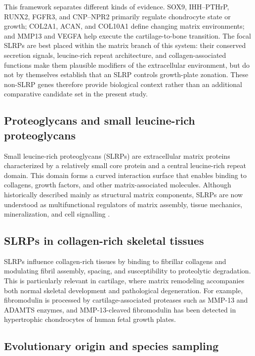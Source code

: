 This framework separates different kinds of evidence. SOX9, IHH--PTHrP,
RUNX2, FGFR3, and CNP--NPR2 primarily regulate chondrocyte state or growth;
COL2A1, ACAN, and COL10A1 define changing matrix environments; and MMP13 and
VEGFA help execute the cartilage-to-bone transition. The focal SLRPs are best
placed within the matrix branch of this system: their conserved secretion
signals, leucine-rich repeat architecture, and collagen-associated functions
make them plausible modifiers of the extracellular environment, but do not by
themselves establish that an SLRP controls growth-plate zonation. These
non-SLRP genes therefore provide biological context rather than an additional
comparative candidate set in the present study.

\subsection{Proteoglycans and small leucine-rich proteoglycans}
\label{subsec:proteoglycans-slrps}

Small leucine-rich proteoglycans (SLRPs) are extracellular matrix proteins characterized by a relatively small core protein and a central leucine-rich repeat domain. This domain forms a curved interaction surface that enables binding to collagens, growth factors, and other matrix-associated molecules. Although historically described mainly as structural matrix components, SLRPs are now understood as multifunctional regulators of matrix assembly, tissue mechanics, mineralization, and cell signalling \citep{SchaeferIozzo2008,IozzoSchaefer2015}.

\subsection{SLRPs in collagen-rich skeletal tissues}
\label{subsec:slrps-skeletal-tissues}

SLRPs influence collagen-rich tissues by binding to fibrillar collagens and modulating fibril assembly, spacing, and susceptibility to proteolytic degradation. This is particularly relevant in cartilage, where matrix remodeling accompanies both normal skeletal development and pathological degeneration. For example, fibromodulin is processed by cartilage-associated proteases such as MMP-13 and ADAMTS enzymes, and MMP-13-cleaved fibromodulin has been detected in hypertrophic chondrocytes of human fetal growth plates.

\subsection{Evolutionary origin and species sampling}
\label{subsec:slrp-evolutionary-origin}

